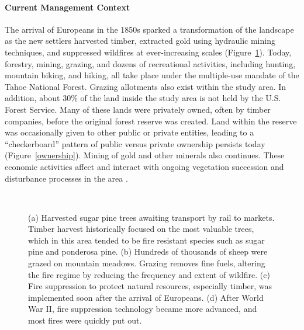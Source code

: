 
\paragraph*{Current Management Context}

The arrival of Europeans in the 1850s sparked a transformation of the landscape as the new settlers harvested timber, extracted gold using hydraulic mining techniques, and suppressed wildfires at ever-increasing scales \citep{Storer1963} (Figure~\ref{figs:historicalphotos}). Today, forestry, mining, grazing, and dozens of recreational activities, including hunting, mountain biking, and hiking, all take place under the multiple-use mandate of the Tahoe National Forest. Grazing allotments also exist within the study area. In addition, 
about 30\% of the land inside the study area is not held by the U.S. Forest Service. Many of these lands were privately owned, often by timber companies, before the original forest reserve was created. Land within the reserve was occasionally given to other public or private entities, leading to a ``checkerboard'' pattern of public versus private ownership persists today (Figure~\ref{ownership}). Mining of gold and other minerals also continues. These economic activities affect and interact with ongoing vegetation succession and disturbance processes in the area \citep{USDAForestService2014}.

\begin{figure}[!htbp]
  \centering
   \\
   \caption{(a) Harvested  sugar pine trees awaiting transport by rail to markets. Timber harvest historically focused on the most valuable trees, which in this area tended to be fire resistant species such as sugar pine and ponderosa pine. (b) Hundreds of thousands of sheep were grazed on mountain meadows. Grazing removes fine fuels, altering the fire regime by reducing the frequency and extent of wildfire. (c) Fire suppression to protect natural resources, especially timber, was implemented soon after the arrival of Europeans. (d) After World War II, fire suppression technology became more advanced, and most fires were quickly put out.} 
\label{figs:historicalphotos}
\end{figure}



